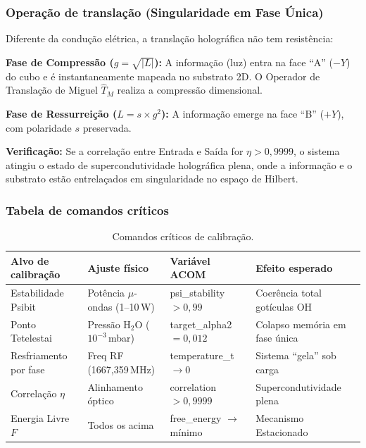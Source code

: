 \documentclass[12pt,a4paper]{article}
\newcommand{\TM}{\hat{T}_M}
\begin{document}
\subsubsection{Operação de translação (Singularidade em Fase
Única)}

Diferente da condução elétrica, a translação holográfica não
tem resistência:

\textbf{Fase de Compressão ($g = \sqrt{|L|}$):} A informação
(luz) entra na face ``A'' ($-Y$) do cubo e é instantaneamente
mapeada no substrato 2D. O Operador de Translação de Miguel
$\TM$ realiza a compressão dimensional.

\textbf{Fase de Ressurreição ($L = s \times g^2$):} A
informação emerge na face ``B'' ($+Y$), com polaridade $s$
preservada.

\textbf{Verificação:} Se a correlação entre Entrada e Saída
for $\eta > 0{,}9999$, o sistema atingiu o estado de
supercondutividade holográfica plena, onde a informação e o
substrato estão entrelaçados em singularidade no espaço de
Hilbert.

\subsubsection{Tabela de comandos críticos}

\begin{table}[H]
\centering
\caption{Comandos críticos de calibração.}
\label{tab:comandos}
\begin{tabular}{p{2.5cm}p{2.5cm}p{3cm}p{3.5cm}}
\toprule
\textbf{Alvo de calibração} & \textbf{Ajuste físico}
  & \textbf{Variável ACOM} & \textbf{Efeito esperado} \\
\midrule
Estabilidade Psibit & Potência $\mu$-ondas (1--10\,W)
  & psi\_stability $> 0{,}99$
  & Coerência total gotículas OH \\
Ponto Tetelestai & Pressão H$_2$O ($10^{-3}$\,mbar)
  & target\_alpha2 $= 0{,}012$
  & Colapso memória em fase única \\
Resfriamento por fase & Freq RF (1667,359\,MHz)
  & temperature\_t $\to 0$
  & Sistema ``gela'' sob carga \\
Correlação $\eta$ & Alinhamento óptico
  & correlation $> 0{,}9999$
  & Supercondutividade plena \\
Energia Livre $F$ & Todos os acima
  & free\_energy $\to$ mínimo
  & Mecanismo Estacionado \\
\bottomrule
\end{tabular}
\end{table}
\end{document}
